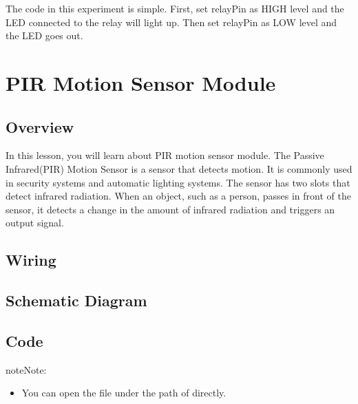 \documentclass[a4paper,11pt,english]{sphinxmanual}
\begin{document}
\sphinxAtStartPar
The code in this experiment is simple. First, set relayPin as HIGH level and the LED connected to the relay will light up. Then set relayPin as LOW level and the LED goes out.

\sphinxstepscope


\section{PIR Motion Sensor Module}
\label{\detokenize{Basic_Project/PIR_Motion_Sensor:pir-motion-sensor-module}}\label{\detokenize{Basic_Project/PIR_Motion_Sensor:basic-pir-motion-sensor}}\label{\detokenize{Basic_Project/PIR_Motion_Sensor::doc}}

\subsection{Overview}
\label{\detokenize{Basic_Project/PIR_Motion_Sensor:overview}}
\sphinxAtStartPar
In this lesson, you will learn about PIR motion sensor module. The Passive Infrared(PIR) Motion Sensor is a sensor that detects motion. It is commonly used in security systems and automatic lighting systems. The sensor has two slots that detect infrared radiation. When an object, such as a person, passes in front of the sensor, it detects a change in the amount of infrared radiation and triggers an output signal.


\subsection{Wiring}
\label{\detokenize{Basic_Project/PIR_Motion_Sensor:wiring}}


\subsection{Schematic Diagram}
\label{\detokenize{Basic_Project/PIR_Motion_Sensor:schematic-diagram}}


\subsection{Code}
\label{\detokenize{Basic_Project/PIR_Motion_Sensor:code}}
\begin{sphinxadmonition}{note}{Note:}\begin{itemize}
\item {} 
\sphinxAtStartPar
You can open the file  under the path of  directly.

\end{itemize}
\end{sphinxadmonition}
\end{document}
